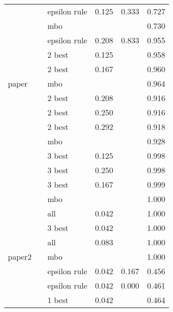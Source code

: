 \begin{table}
\begin{tabular}[t]{lrlrrr}
 &  & epsilon rule & 0.125 & 0.333 & 0.727\\

 & \multirow{-4}{*}{\raggedleft\arraybackslash 1000} & mbo &  &  & 0.730\\
\cmidrule{2-6}
 &  & epsilon rule & 0.208 & 0.833 & 0.955\\

 &  & 2 best & 0.125 &  & 0.958\\

 &  & 2 best & 0.167 &  & 0.960\\

\multirow{-12}{*}{\raggedright\arraybackslash paper} & \multirow{-4}{*}{\raggedleft\arraybackslash 2000} & mbo &  &  & 0.964\\
\cmidrule{1-6}
 &  & 2 best & 0.208 &  & 0.916\\

 &  & 2 best & 0.250 &  & 0.916\\

 &  & 2 best & 0.292 &  & 0.918\\

 & \multirow{-4}{*}{\raggedleft\arraybackslash 500} & mbo &  &  & 0.928\\
\cmidrule{2-6}
 &  & 3 best & 0.125 &  & 0.998\\

 &  & 3 best & 0.250 &  & 0.998\\

 &  & 3 best & 0.167 &  & 0.999\\

 & \multirow{-4}{*}{\raggedleft\arraybackslash 1000} & mbo &  &  & 1.000\\
\cmidrule{2-6}
 &  & all & 0.042 &  & 1.000\\

 &  & 3 best & 0.042 &  & 1.000\\

 &  & all & 0.083 &  & 1.000\\

\multirow{-12}{*}{\raggedright\arraybackslash paper2} & \multirow{-4}{*}{\raggedleft\arraybackslash 2000} & mbo &  &  & 1.000\\
\cmidrule{1-6}
 &  & epsilon rule & 0.042 & 0.167 & 0.456\\

 &  & epsilon rule & 0.042 & 0.000 & 0.461\\

 &  & 1 best & 0.042 &  & 0.464\\


\end{tabular}
\end{table}
